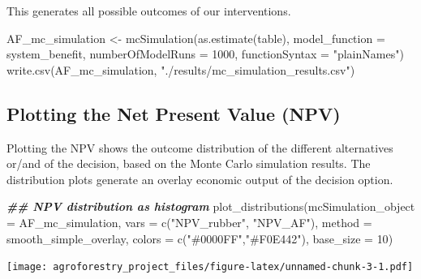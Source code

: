 \documentclass[
]{article}
\newenvironment{Shaded}{\begin{snugshade}}{\end{snugshade}}
\newcommand{\AttributeTok}[1]{\textcolor[rgb]{0.77,0.63,0.00}{#1}}
\newcommand{\DecValTok}[1]{\textcolor[rgb]{0.00,0.00,0.81}{#1}}
\newcommand{\DocumentationTok}[1]{\textcolor[rgb]{0.56,0.35,0.01}{\textbf{\textit{#1}}}}
\newcommand{\FunctionTok}[1]{\textcolor[rgb]{0.00,0.00,0.00}{#1}}
\newcommand{\NormalTok}[1]{#1}
\newcommand{\OtherTok}[1]{\textcolor[rgb]{0.56,0.35,0.01}{#1}}
\newcommand{\StringTok}[1]{\textcolor[rgb]{0.31,0.60,0.02}{#1}}
\begin{document}
This generates all possible outcomes of our interventions.

\begin{Shaded}
\begin{Highlighting}[]
\NormalTok{AF\_mc\_simulation }\OtherTok{\textless{}{-}} \FunctionTok{mcSimulation}\NormalTok{(}\FunctionTok{as.estimate}\NormalTok{(table),}
                                         \AttributeTok{model\_function =}\NormalTok{ system\_benefit,}
                                         \AttributeTok{numberOfModelRuns =} \DecValTok{1000}\NormalTok{,}
                                         \AttributeTok{functionSyntax =} \StringTok{"plainNames"}\NormalTok{)}
\FunctionTok{write.csv}\NormalTok{(AF\_mc\_simulation, }\StringTok{"./results/mc\_simulation\_results.csv"}\NormalTok{)}
\end{Highlighting}
\end{Shaded}

\hypertarget{plotting-the-net-present-value-npv}{%
\subsection{\texorpdfstring{\textbf{Plotting the Net Present Value (NPV)}}{Plotting the Net Present Value (NPV)}}\label{plotting-the-net-present-value-npv}}

Plotting the NPV shows the outcome distribution of the different alternatives or/and of the decision, based on the Monte Carlo simulation results. The distribution plots generate an overlay economic output of the decision option.

\begin{Shaded}
\begin{Highlighting}[]
\DocumentationTok{\#\# NPV distribution as histogram}
\FunctionTok{plot\_distributions}\NormalTok{(}\AttributeTok{mcSimulation\_object =}\NormalTok{ AF\_mc\_simulation,}
                  \AttributeTok{vars =} \FunctionTok{c}\NormalTok{(}\StringTok{"NPV\_rubber"}\NormalTok{, }\StringTok{"NPV\_AF"}\NormalTok{),}
                  \AttributeTok{method =} \StringTok{\textquotesingle{}smooth\_simple\_overlay\textquotesingle{}}\NormalTok{,}
                  \AttributeTok{colors =} \FunctionTok{c}\NormalTok{(}\StringTok{"\#0000FF"}\NormalTok{,}\StringTok{"\#F0E442"}\NormalTok{),}
                  \AttributeTok{base\_size =} \DecValTok{10}\NormalTok{)}
\end{Highlighting}
\end{Shaded}

\texttt{[image: agroforestry\_project\_files/figure-latex/unnamed-chunk-3-1.pdf]}
\end{document}
